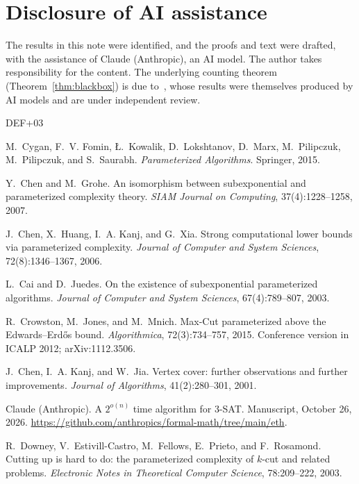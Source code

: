 \documentclass[11pt]{amsart}
\theoremstyle{definition}
\theoremstyle{remark}
\begin{document}
\section*{Disclosure of AI assistance}
The results in this note were identified, and the proofs and text were drafted, with the assistance of Claude (Anthropic), an AI model. The author takes responsibility for the content. The underlying counting theorem (Theorem~\ref{thm:blackbox}) is due to~\cite{Ope26,Cla26}, whose results were themselves produced by AI models and are under independent review.

\begin{thebibliography}{DEF+03}

M.~Cygan, F.~V. Fomin, {\L}.~Kowalik, D.~Lokshtanov, D.~Marx, M.~Pilipczuk, M.~Pilipczuk, and S.~Saurabh.
\newblock \emph{Parameterized Algorithms}.
\newblock Springer, 2015.

Y.~Chen and M.~Grohe.
\newblock An isomorphism between subexponential and parameterized complexity theory.
\newblock \emph{SIAM Journal on Computing}, 37(4):1228--1258, 2007.

J.~Chen, X.~Huang, I.~A. Kanj, and G.~Xia.
\newblock Strong computational lower bounds via parameterized complexity.
\newblock \emph{Journal of Computer and System Sciences}, 72(8):1346--1367, 2006.

L.~Cai and D.~Juedes.
\newblock On the existence of subexponential parameterized algorithms.
\newblock \emph{Journal of Computer and System Sciences}, 67(4):789--807, 2003.

R.~Crowston, M.~Jones, and M.~Mnich.
\newblock Max-Cut parameterized above the Edwards--Erd\H{o}s bound.
\newblock \emph{Algorithmica}, 72(3):734--757, 2015. Conference version in ICALP 2012; arXiv:1112.3506.

J.~Chen, I.~A. Kanj, and W.~Jia.
\newblock Vertex cover: further observations and further improvements.
\newblock \emph{Journal of Algorithms}, 41(2):280--301, 2001.

Claude (Anthropic).
\newblock A $2^{o(n)}$ time algorithm for 3-SAT.
\newblock Manuscript, October 26, 2026. \url{https://github.com/anthropics/formal-math/tree/main/eth}.

R.~Downey, V.~Estivill-Castro, M.~Fellows, E.~Prieto, and F.~Rosamond.
\newblock Cutting up is hard to do: the parameterized complexity of $k$-cut and related problems.
\newblock \emph{Electronic Notes in Theoretical Computer Science}, 78:209--222, 2003.


\end{thebibliography}
\end{document}
